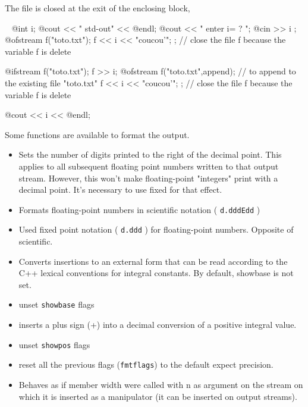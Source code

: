 \documentclass[a4paper,twoside,12pt]{book}
\def\n{\nabla}
\begin{document}
\begin{note} The file is closed
at the exit of the enclosing block,
\end{note}
\begin{example}~
\label{exm:io}
\bFF
@int i;
@cout << " std-out" << @endl;
@cout << " enter i= ? ";
@cin >> i ;
{
  @ofstream f("toto.txt");
  f << i << "coucou'\n";
}; //  close the file f because the variable f is delete

{
  @ifstream f("toto.txt");
   f >> i;
}
{
  @ofstream f("toto.txt",append);
     // to append to the existing file "toto.txt"
  f << i << "coucou'\n";
}; //  close the file f because the variable f is delete

  @cout << i << @endl;
\eFF


  

Some functions are available  to format the output.
\begin{itemize}
\item {} Sets the number of digits printed to the right of the decimal point. This applies to all subsequent floating point numbers written to that output stream. However, this won't make floating-point "integers" print with a decimal point. It's necessary to use fixed for that effect.
\item     {}  Formats floating-point numbers in scientific notation (  \texttt{d.dddEdd} )
\item     {}          Used fixed point notation (  \texttt{d.ddd} ) for floating-point numbers. Opposite of scientific.
\item     {}    Converts insertions to an external form that can be read according to the C++ lexical conventions for integral constants. By default, showbase is not set.
\item     {}   unset \texttt{showbase} flags
\item     {}    inserts a plus sign (+) into a decimal conversion of a positive integral value.
\item     {}  unset \texttt{showpos} flags
 \item   {}     reset all  the previous  flags (\texttt{fmtflags}) to the  default expect precision.
 \item   {} Behaves as if member width were called with n as argument on the stream on which it is inserted as a manipulator (it can be inserted on output streams).


\end{itemize}
\end{example}
\end{document}
